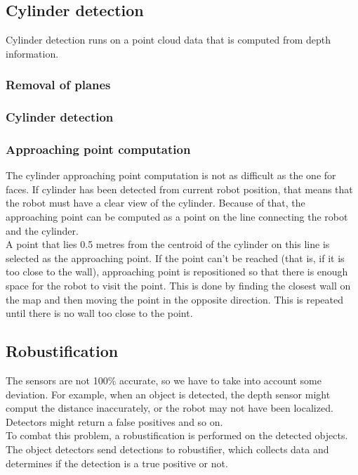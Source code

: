 \documentclass[12pt,a4paper]{article}
\begin{document}
	\subsection{Cylinder detection}
	Cylinder detection runs on a point cloud data that is computed from depth information. \\
	
	\subsubsection{Removal of planes}
	\subsubsection{Cylinder detection}
	
	\subsubsection{Approaching point computation}
	The cylinder approaching point computation is not as difficult as the one for faces. If cylinder has been detected from current robot position, that means that the robot must have a clear view of the cylinder. Because of that, the approaching point can be computed as a point on the line connecting the robot and the cylinder. \\
	
	A point that lies 0.5 metres from the centroid of the cylinder on this line is selected as the approaching point. If the point can't be reached (that is, if it is too close to the wall), approaching point is repositioned so that there is enough space for the robot to visit the point. This is done by finding the closest wall on the map and then moving the point in the opposite direction. This is repeated until there is no wall too close to the point. \\
	
	\subsection{Robustification} \label{robustification}
	The sensors are not 100\% accurate, so we have to take into account some deviation. For example, when an object is detected, the depth sensor might comput the distance inaccurately, or the robot may not have been localized. Detectors might return a false positives and so on. \\
	
	To combat this problem, a robustification is performed on the detected objects. The object detectors send detections to robustifier, which collects data and determines if the detection is a true positive or not. \\
	
\end{document}
